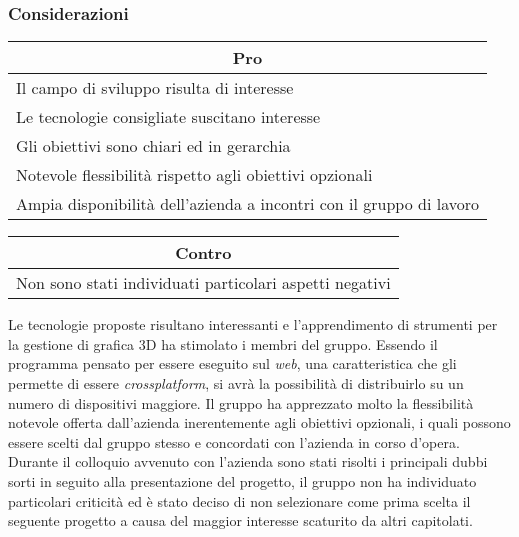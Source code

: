 \subsubsection{Considerazioni}
\begin{minipage}[t]{0.45\linewidth}
    \vspace{0pt}
    {\renewcommand{\arraystretch}{1.5}
    \begin{tabular}{p{1\linewidth}}
        \multicolumn{1}{c}{\textbf{Pro}} \\
        \midrule
		Il campo di sviluppo risulta di interesse \\
		Le tecnologie consigliate suscitano interesse \\
		Gli obiettivi sono chiari ed in gerarchia \\
		Notevole flessibilità rispetto agli obiettivi opzionali \\
		Ampia disponibilità dell'azienda a incontri con il gruppo di lavoro \\
        \hline
    \end{tabular}
    }
\end{minipage}
\hspace{0.05\linewidth}
\begin{minipage}[t]{0.45\linewidth}
    \vspace{0pt}
    {\renewcommand{\arraystretch}{1.5}
    \begin{tabular}{p{1\linewidth}}
        \multicolumn{1}{c}{\textbf{Contro}} \\
        \midrule
        Non sono stati individuati particolari aspetti negativi \\
        \hline
    \end{tabular}
    }
\end{minipage}
\vspace{1em}

Le tecnologie proposte risultano interessanti e l'apprendimento di strumenti per 
la gestione di grafica 3D ha stimolato i membri del gruppo.
Essendo il programma pensato per essere eseguito sul \textit{web}, una caratteristica che 
gli permette di essere \textit{crossplatform}, si avrà la possibilità di distribuirlo su un numero di dispositivi maggiore. Il gruppo ha apprezzato molto la
flessibilità notevole offerta dall'azienda inerentemente agli obiettivi
opzionali, i quali possono essere scelti dal gruppo stesso e concordati con l'azienda in corso
d'opera.
Durante il colloquio avvenuto con l'azienda sono stati risolti i principali dubbi sorti in seguito alla presentazione del progetto, il gruppo non ha individuato particolari criticità ed è stato deciso di non selezionare come prima scelta il seguente progetto a causa del maggior interesse scaturito da altri capitolati.